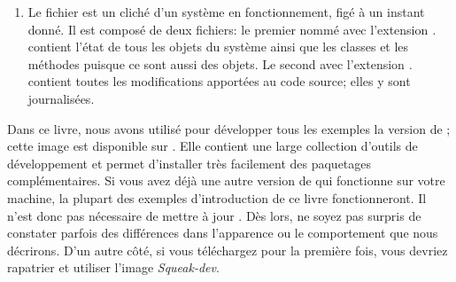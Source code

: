 \documentclass[a4paper,10pt,twoside]{book}
\begin{document}
\begin{enumerate}

\item Le fichier \emph{} est un cliché d'un système en fonctionnement, figé à un instant donné. 
Il est composé de deux fichiers: le premier nommé avec l'extension
\emph{.} contient l'état de tous les objets du système
ainsi que les classes et les méthodes puisque ce sont aussi des
objets. Le second avec l'extension \emph{.} contient
toutes les modifications apportées au code source; elles y sont journalisées.

\end{enumerate}



Dans ce livre, nous avons utilisé pour d\'evelopper tous les exemples
la version  de \sq; cette image est disponible sur
\squeakdev. 
\label{sec:squeakDev}
Elle contient une large collection d'outils de développement et permet d'installer très facilement des paquetages complémentaires.
Si vous avez déjà une autre version de \sq qui fonctionne sur votre
machine, la plupart des exemples d'introduction de ce livre
fonctionneront. Il n'est donc pas nécessaire de mettre à jour \sq.
D\`es lors, ne soyez pas surpris de constater parfois des différences dans l'apparence ou le comportement que nous décrirons.
D'un autre c\^ot\'e, si vous téléchargez \sq pour la première fois,
vous devriez rapatrier et utiliser l'image \emph{Squeak-dev}.
\end{document}
